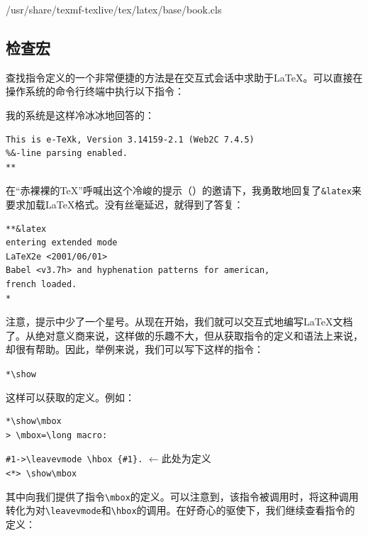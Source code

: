 \begin{dmd}
/usr/share/texmf-texlive/tex/latex/base/book.cls
\end{dmd}

\subsection{检查宏}

查找指令定义的一个非常便捷的方法是在交互式会话中求助于\LaTeX 。可以直接在操作系统的命令行终端中执行以下指令：


我的系统是这样冷冰冰地回答的：

\begin{dmd}
\begin{verbatim}
This is e-TeXk, Version 3.14159-2.1 (Web2C 7.4.5)
%&-line parsing enabled.
**\end{verbatim}
\end{dmd}

在“赤裸裸的\TeX ”呼喊出这个冷峻的提示（\dm{**}）的邀请下，我勇敢地回复了\verb|&latex|来要求加载\LaTeX 格式。没有丝毫延迟，就得到了答复：

\begin{dmd}
\begin{verbatim}
**&latex
entering extended mode
LaTeX2e <2001/06/01>
Babel <v3.7h> and hyphenation patterns for american,
french loaded.
*\end{verbatim}
\end{dmd}

注意，提示中少了一个星号。从现在开始，我们就可以交互式地编写\LaTeX 文档了。从绝对意义商来说，这样做的乐趣不大，但从获取指令的定义和语法上来说，却很有帮助。因此，举例来说，我们可以写下这样的指令：

\begin{dmd}
\verb|*\show|
\end{dmd}

这样可以获取的定义。例如：

\begin{dmd}
\begin{verbatim}
*\show\mbox
> \mbox=\long macro:\end{verbatim}
\verb|#1->\leavevmode \hbox {#1}.| \quad $\leftarrow$\textsf{此处为定义}\\
\verb+<*> \show\mbox+
\end{dmd}

其中向我们提供了指令\verb|\mbox|的定义。可以注意到，该指令被调用时，将这种调用转化为对\verb|\leavevmode|和\verb|\hbox|的调用。在好奇心的驱使下，我们继续查看指令的定义：

